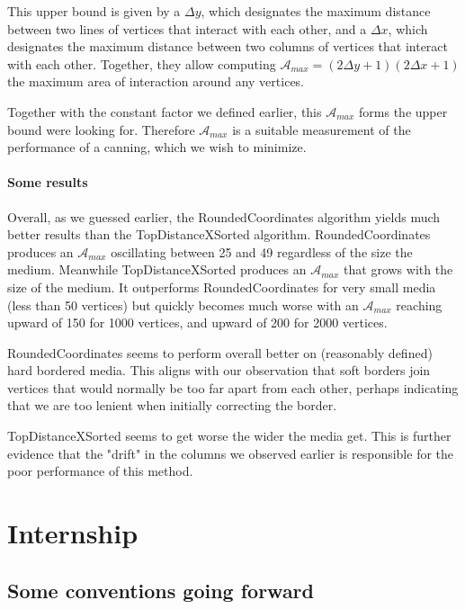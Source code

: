 \documentclass{report}
\begin{document}
This upper bound is given by a $\Delta y$, which designates the maximum distance between two lines of vertices that interact with each other, and a $\Delta x$, which designates the maximum distance between two columns of vertices that interact with each other. Together, they allow computing $\mathcal{A}_{max} = (2\Delta y + 1)(2\Delta x + 1)$ the maximum area of interaction around any vertices.

Together with the constant factor we defined earlier, this $\mathcal{A}_{max}$ forms the upper bound were looking for. Therefore $\mathcal{A}_{max}$ is a suitable measurement of the performance of a canning, which we wish to minimize.

\subsubsection{Some results}

Overall, as we guessed earlier, the RoundedCoordinates algorithm yields much better results than the TopDistanceXSorted algorithm. RoundedCoordinates produces an $\mathcal{A}_{max}$ oscillating between 25 and 49 regardless of the size the medium. Meanwhile TopDistanceXSorted produces an $\mathcal{A}_{max}$ that grows with the size of the medium. It outperforms RoundedCoordinates for very small media (less than 50 vertices) but quickly becomes much worse with an $\mathcal{A}_{max}$ reaching upward of 150 for 1000 vertices, and upward of 200 for 2000 vertices.

RoundedCoordinates seems to perform overall better on (reasonably defined) hard bordered media. This aligns with our observation that soft borders join vertices that would normally be too far apart from each other, perhaps indicating that we are too lenient when initially correcting the border.

TopDistanceXSorted seems to get worse the wider the media get. This is further evidence that the "drift" in the columns we observed earlier is responsible for the poor performance of this method.

\chapter{Internship}

\setcounter{section}{-1}
\section{Some conventions going forward}
\end{document}

